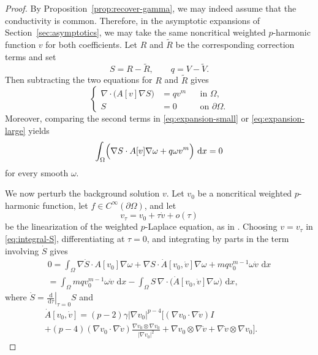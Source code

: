 \documentclass[a4paper,12pt]{article}
\newcommand{\pr}{\partial}
\newcommand{\dd}{\,\mathrm{d}}
\theoremstyle{definition}
\theoremstyle{remark}
\begin{document}
\begin{proof}
By Proposition~\ref{prop:recover-gamma}, we may indeed assume that the conductivity is common. Therefore, in the asymptotic expansions of Section~\ref{sec:asymptotics}, we may take the same noncritical weighted $p$-harmonic function $v$ for both coefficients. Let $R$ and $\tilde R$ be the corresponding correction terms and set
\[
S=R-\tilde R,
\qquad
q=V-\tilde V.
\]
Then subtracting the two equations for $R$ and $\tilde R$ gives
\begin{equation}\label{eq:S-equation}
\left\{
\begin{aligned}
\nabla\cdot\bigl(A[v]\nabla S\bigr)&=qv^m &&\text{in }\Omega,\\
S&=0 &&\text{on }\pr\Omega.
\end{aligned}
\right.
\end{equation}
Moreover, comparing the second terms in \eqref{eq:expansion-small} or \eqref{eq:expansion-large} yields
\begin{equation}\label{eq:integral-S}
\int_\Omega\Bigl(\nabla S\cdot A[v]\nabla\omega+q\omega v^m\Bigr)\,\dd x=0
\end{equation}
for every smooth $\omega$.

We now perturb the background solution $v$. Let $v_0$ be a noncritical weighted $p$-harmonic function, let $f\in C^\infty(\pr\Omega)$, and let
\[
v_\tau=v_0+\tau\dot v+o(\tau)
\]
be the linearization of the weighted $p$-Laplace equation, as in \cite{CarFe3}. Choosing $v=v_\tau$ in \eqref{eq:integral-S}, differentiating at $\tau=0$, and integrating by parts in the term involving $\dot S$ gives
\begin{multline}\label{eq:integral-identity}
0=\int_\Omega \nabla \dot S \cdot A[v_0]\nabla\omega+\nabla S \cdot \dot A[v_0,\dot v]\nabla\omega+mqv_0^{m-1}\omega \dot v\,\dd x\\
=\int_\Omega mqv_0^{m-1}\omega \dot v\,\dd x-\int_\Omega S\,\nabla \cdot \bigl(\dot A[v_0,\dot v]\nabla\omega\bigr)\,\dd x,
\end{multline}
where $\dot S=\left.\frac{\dd}{\dd\tau}\right|_{\tau=0}S$ and
\begin{multline*}
\dot A[v_0,\dot v]=(p-2)\gamma|\nabla v_0|^{p-4}\Big[(\nabla v_0\cdot\nabla \dot v)I\hspace{7em}\\
+(p-4)(\nabla v_0\cdot\nabla \dot v)\frac{\nabla v_0\otimes\nabla v_0}{|\nabla v_0|^2}+\nabla v_0\otimes\nabla \dot v+\nabla \dot v\otimes\nabla v_0\Big].
\end{multline*}


\end{proof}
\end{document}
